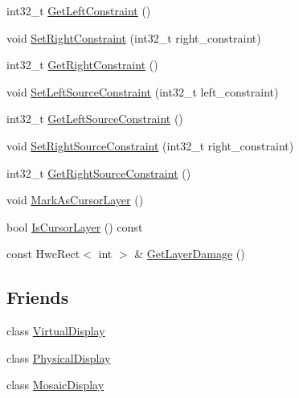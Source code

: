 \begin{DoxyCompactItemize}
int32\+\_\+t \mbox{\hyperlink{structhwcomposer_1_1HwcLayer_ab1fcb6990d20cf2aabe9fa48fc24d45d}{Get\+Left\+Constraint}} ()
\item 
void \mbox{\hyperlink{structhwcomposer_1_1HwcLayer_aae0fe742a000713f6e77a093f3f4729b}{Set\+Right\+Constraint}} (int32\+\_\+t right\+\_\+constraint)
\item 
int32\+\_\+t \mbox{\hyperlink{structhwcomposer_1_1HwcLayer_aab827de433954ca578f981e25f340747}{Get\+Right\+Constraint}} ()
\item 
void \mbox{\hyperlink{structhwcomposer_1_1HwcLayer_ae0efd88202c2ecda46279405e7618db2}{Set\+Left\+Source\+Constraint}} (int32\+\_\+t left\+\_\+constraint)
\item 
int32\+\_\+t \mbox{\hyperlink{structhwcomposer_1_1HwcLayer_a6e67d33007cd1fd5d7b4882e9c9e27b4}{Get\+Left\+Source\+Constraint}} ()
\item 
void \mbox{\hyperlink{structhwcomposer_1_1HwcLayer_a1c089e26cd35485fd7a8a368434298ab}{Set\+Right\+Source\+Constraint}} (int32\+\_\+t right\+\_\+constraint)
\item 
int32\+\_\+t \mbox{\hyperlink{structhwcomposer_1_1HwcLayer_a6ab5474e985f9f88d8eaac4de4dda5a5}{Get\+Right\+Source\+Constraint}} ()
\item 
void \mbox{\hyperlink{structhwcomposer_1_1HwcLayer_a7556bacbb2697f51b2c2cc30a9ed661a}{Mark\+As\+Cursor\+Layer}} ()
\item 
bool \mbox{\hyperlink{structhwcomposer_1_1HwcLayer_ac6692424ce0f4839a3e59793cf3efd16}{Is\+Cursor\+Layer}} () const
\item 
const Hwc\+Rect$<$ int $>$ \& \mbox{\hyperlink{structhwcomposer_1_1HwcLayer_a223024192844b0dec2cbfa695874b8d8}{Get\+Layer\+Damage}} ()
\end{DoxyCompactItemize}
\subsection*{Friends}
\begin{DoxyCompactItemize}
\item 
class \mbox{\hyperlink{structhwcomposer_1_1HwcLayer_a95c8d2c73f3d42e358849aecbd0d691a}{Virtual\+Display}}
\item 
class \mbox{\hyperlink{structhwcomposer_1_1HwcLayer_a3e381d9464ef96b091fe38d2919fda4a}{Physical\+Display}}
\item 
class \mbox{\hyperlink{structhwcomposer_1_1HwcLayer_a8bb316b15cb60543aa8339f1d11a8ae1}{Mosaic\+Display}}
\end{DoxyCompactItemize}


